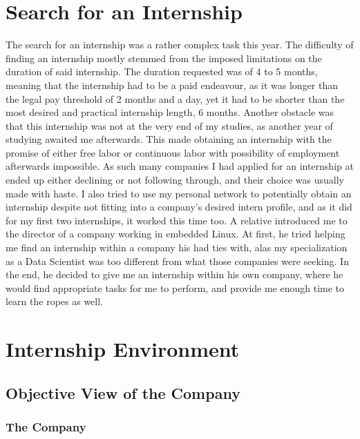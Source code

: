 \documentclass[12pt]{article}
\begin{document}
\newpage
\tableofcontents
\listoffigures

\section{Search for an Internship}

The search for an internship was a rather complex task this year. The difficulty of finding an internship mostly stemmed from the imposed limitations on the duration of said internship. The duration requested was of 4 to 5 months, meaning that the internship had to be a paid endeavour, as it was longer than the legal pay threshold of 2 months and a day, yet it had to be shorter than the most desired and practical internship length, 6 months. Another obstacle was that this internship was not at the very end of my studies, as another year of studying awaited me afterwards. This made obtaining an internship with the promise of either free labor or continuous labor with possibility of employment afterwards impossible. As such many companies I had applied for an internship at ended up either declining or not following through, and their choice was usually made with haste. I also tried to use my personal network to potentially obtain an internship despite not fitting into a company's desired intern profile, and as it did for my first two internships, it worked this time too. A relative introduced me to the director of a company working in embedded Linux. At first, he tried helping me find an internship within a company his had ties with, alas my specialization as a Data Scientist was too different from what those companies were seeking. In the end, he decided to give me an internship within his own company, where he would find appropriate tasks for me to perform, and provide me enough time to learn the ropes as well.

\newpage
\section{Internship Environment}

\subsection{Objective View of the Company}

\subsubsection{The Company}
\end{document}
